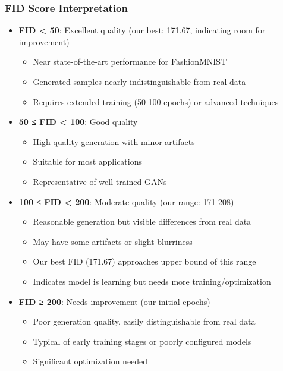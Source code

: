 \documentclass[conference,12pt]{IEEEtran}
\begin{document}
\subsubsection{FID Score Interpretation}

\begin{itemize}
    \item \textbf{FID < 50}: Excellent quality (our best: 171.67, indicating room for improvement)
    \begin{itemize}
        \item Near state-of-the-art performance for FashionMNIST
        \item Generated samples nearly indistinguishable from real data
        \item Requires extended training (50-100 epochs) or advanced techniques
    \end{itemize}
    \item \textbf{50 ≤ FID < 100}: Good quality
    \begin{itemize}
        \item High-quality generation with minor artifacts
        \item Suitable for most applications
        \item Representative of well-trained GANs
    \end{itemize}
    \item \textbf{100 ≤ FID < 200}: Moderate quality (our range: 171-208)
    \begin{itemize}
        \item Reasonable generation but visible differences from real data
        \item May have some artifacts or slight blurriness
        \item Our best FID (171.67) approaches upper bound of this range
        \item Indicates model is learning but needs more training/optimization
    \end{itemize}
    \item \textbf{FID ≥ 200}: Needs improvement (our initial epochs)
    \begin{itemize}
        \item Poor generation quality, easily distinguishable from real data
        \item Typical of early training stages or poorly configured models
        \item Significant optimization needed
    \end{itemize}
\end{itemize}
\end{document}
